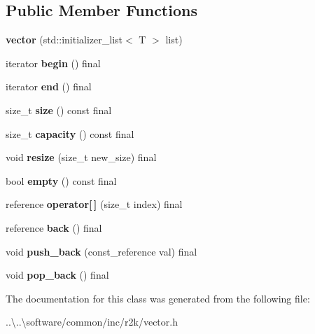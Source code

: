 \subsection*{Public Member Functions}
\begin{DoxyCompactItemize}
\item 
\mbox{\label{classr2k_1_1vector_a2d34a926326d09caf04e2f9fef3c7639}} 
{\bfseries vector} (std\+::initializer\+\_\+list$<$ T $>$ list)
\item 
\mbox{\label{classr2k_1_1vector_ad97dcdfbffc7861b98db53a989e5ef1b}} 
iterator {\bfseries begin} () final
\item 
\mbox{\label{classr2k_1_1vector_a4ec92e257ec07dd3dcc6ad7dea48e38f}} 
iterator {\bfseries end} () final
\item 
\mbox{\label{classr2k_1_1vector_adc409c3e3abec361aed5e6b84c75c672}} 
size\+\_\+t {\bfseries size} () const final
\item 
\mbox{\label{classr2k_1_1vector_af41940ac9c07142b1c88477ebee14b2d}} 
size\+\_\+t {\bfseries capacity} () const final
\item 
\mbox{\label{classr2k_1_1vector_a25615e7c045cfdcc3708748ef652b8d4}} 
void {\bfseries resize} (size\+\_\+t new\+\_\+size) final
\item 
\mbox{\label{classr2k_1_1vector_aba33ce74792e2586fa00f5fe53b417e6}} 
bool {\bfseries empty} () const final
\item 
\mbox{\label{classr2k_1_1vector_a089d03b612cf42f0cf726c2473a1ac67}} 
reference {\bfseries operator\mbox{[}$\,$\mbox{]}} (size\+\_\+t index) final
\item 
\mbox{\label{classr2k_1_1vector_a41640207a0d0a01388ed23bd73dc55a8}} 
reference {\bfseries back} () final
\item 
\mbox{\label{classr2k_1_1vector_a5bb6f8917bf4970ebf6cf3f47b8d6c11}} 
void {\bfseries push\+\_\+back} (const\+\_\+reference val) final
\item 
\mbox{\label{classr2k_1_1vector_aa9ccbcf949a833c555dcdb53710b8462}} 
void {\bfseries pop\+\_\+back} () final
\end{DoxyCompactItemize}


The documentation for this class was generated from the following file\+:\begin{DoxyCompactItemize}
\item 
..\textbackslash{}..\textbackslash{}software/common/inc/r2k/vector.\+h\end{DoxyCompactItemize}
